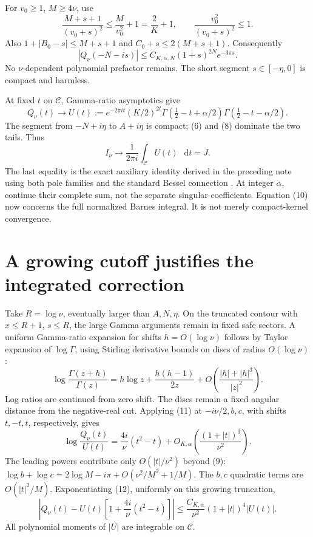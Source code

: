 \documentclass[11pt,a4paper]{article}
\newcommand{\dd}{\mathop{}\!\mathrm d}
\newcommand{\Q}{Q_\nu}
\begin{document}
For \(v_0\ge1\), \(M\ge4\nu\), use
\[
 \frac{M+s+1}{(v_0+s)^2}\le\frac{M}{v_0^2}+1=\frac2K+1,
 \qquad \frac{v_0^2}{(v_0+s)^2}\le1.
\]
Also \(1+|B_0-s|\le M+s+1\) and \(C_0+s\le2(M+s+1)\).
Consequently
\[
 |\Q(-N-is)|\le C_{K,\alpha,N}(1+s)^{2N}e^{-3\pi s}.
 \tag{8}
\]
No \(\nu\)-dependent polynomial prefactor remains.
The short segment \(s\in[-\eta,0]\) is compact and harmless.

At fixed \(t\) on \(\mathcal C\), Gamma-ratio asymptotics give
\[
 \Q(t)\longrightarrow
 U(t):=e^{-2\pi it}(K/2)^{2t}
 \Gamma(\tfrac12-t+\alpha/2)\Gamma(\tfrac12-t-\alpha/2).
 \tag{9}
\]
The segment from \(-N+i\eta\) to \(A+i\eta\) is compact;
(6) and (8) dominate the two tails. Thus
\[
 I_\nu\longrightarrow\frac1{2\pi i}\int_{\mathcal C}U(t)\,\dd t=J.
 \tag{10}
\]
The last equality is the exact auxiliary identity derived in the
preceding note using both pole families and the standard Bessel
connection \cite{bessel,continuation}. At integer \(\alpha\),
continue their complete sum, not the separate singular coefficients.
Equation (10) now concerns the full normalized Barnes integral.
It is not merely compact-kernel convergence.

\newpage
\section{A growing cutoff justifies the integrated correction}
Take \(R=\log\nu\), eventually larger than \(A,N,\eta\).
On the truncated contour with \(x\le R+1\), \(s\le R\), the
large Gamma arguments remain in fixed safe sectors. A uniform
Gamma-ratio expansion for shifts \(h=O(\log\nu)\) follows by
Taylor expansion of \(\log\Gamma\), using Stirling derivative
bounds on discs of radius \(O(\log\nu)\):
\[
 \log\frac{\Gamma(z+h)}{\Gamma(z)}
 =h\log z+\frac{h(h-1)}{2z}
   +O\!\left(\frac{|h|+|h|^3}{|z|^2}\right).
 \tag{11}
\]
Log ratios are continued from zero shift. The discs remain a fixed
angular distance from the negative-real cut.
Applying (11) at \(-i\nu/2,b,c\), with shifts \(t,-t,t\),
respectively, gives
\[
 \log\frac{\Q(t)}{U(t)}
 =\frac{4i}{\nu}(t^2-t)
 +O_{K,\alpha}\!\left(\frac{(1+|t|)^3}{\nu^2}\right). \tag{12}
\]
The leading powers contribute only \(O(|t|/\nu^2)\) beyond (9):
\(\log b+\log c=2\log M-i\pi+O(\nu^2/M^2+1/M)\).
The \(b,c\) quadratic terms are \(O(|t|^2/M)\).
Exponentiating (12), uniformly on this growing truncation,
\[
 \left|\Q(t)-U(t)\left[1+\frac{4i}{\nu}(t^2-t)\right]\right|
 \le \frac{C_{K,\alpha}}{\nu^2}(1+|t|)^4|U(t)|. \tag{13}
\]
All polynomial moments of \(|U|\) are integrable on \(\mathcal C\).
\end{document}
